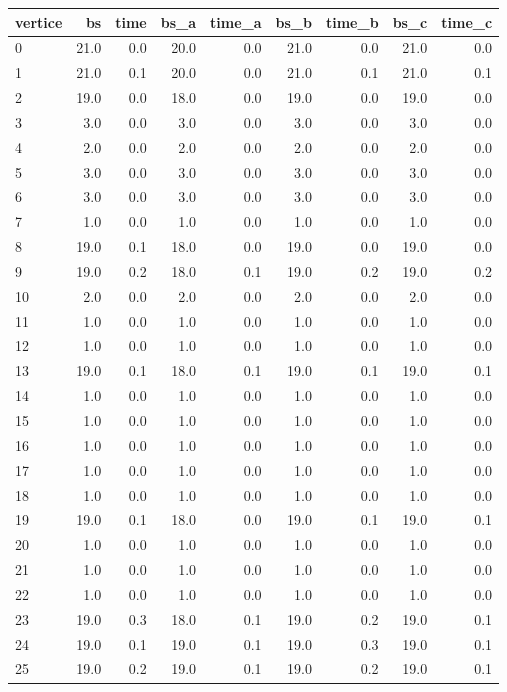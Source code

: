 \begin{tabular}{lrrrrrrrr}
\toprule
vertice & bs & time & bs_a & time_a & bs_b & time_b & bs_c & time_c \\
\midrule
0 & 21.0 & 0.0 & 20.0 & 0.0 & 21.0 & 0.0 & 21.0 & 0.0 \\
1 & 21.0 & 0.1 & 20.0 & 0.0 & 21.0 & 0.1 & 21.0 & 0.1 \\
2 & 19.0 & 0.0 & 18.0 & 0.0 & 19.0 & 0.0 & 19.0 & 0.0 \\
3 & 3.0 & 0.0 & 3.0 & 0.0 & 3.0 & 0.0 & 3.0 & 0.0 \\
4 & 2.0 & 0.0 & 2.0 & 0.0 & 2.0 & 0.0 & 2.0 & 0.0 \\
5 & 3.0 & 0.0 & 3.0 & 0.0 & 3.0 & 0.0 & 3.0 & 0.0 \\
6 & 3.0 & 0.0 & 3.0 & 0.0 & 3.0 & 0.0 & 3.0 & 0.0 \\
7 & 1.0 & 0.0 & 1.0 & 0.0 & 1.0 & 0.0 & 1.0 & 0.0 \\
8 & 19.0 & 0.1 & 18.0 & 0.0 & 19.0 & 0.0 & 19.0 & 0.0 \\
9 & 19.0 & 0.2 & 18.0 & 0.1 & 19.0 & 0.2 & 19.0 & 0.2 \\
10 & 2.0 & 0.0 & 2.0 & 0.0 & 2.0 & 0.0 & 2.0 & 0.0 \\
11 & 1.0 & 0.0 & 1.0 & 0.0 & 1.0 & 0.0 & 1.0 & 0.0 \\
12 & 1.0 & 0.0 & 1.0 & 0.0 & 1.0 & 0.0 & 1.0 & 0.0 \\
13 & 19.0 & 0.1 & 18.0 & 0.1 & 19.0 & 0.1 & 19.0 & 0.1 \\
14 & 1.0 & 0.0 & 1.0 & 0.0 & 1.0 & 0.0 & 1.0 & 0.0 \\
15 & 1.0 & 0.0 & 1.0 & 0.0 & 1.0 & 0.0 & 1.0 & 0.0 \\
16 & 1.0 & 0.0 & 1.0 & 0.0 & 1.0 & 0.0 & 1.0 & 0.0 \\
17 & 1.0 & 0.0 & 1.0 & 0.0 & 1.0 & 0.0 & 1.0 & 0.0 \\
18 & 1.0 & 0.0 & 1.0 & 0.0 & 1.0 & 0.0 & 1.0 & 0.0 \\
19 & 19.0 & 0.1 & 18.0 & 0.0 & 19.0 & 0.1 & 19.0 & 0.1 \\
20 & 1.0 & 0.0 & 1.0 & 0.0 & 1.0 & 0.0 & 1.0 & 0.0 \\
21 & 1.0 & 0.0 & 1.0 & 0.0 & 1.0 & 0.0 & 1.0 & 0.0 \\
22 & 1.0 & 0.0 & 1.0 & 0.0 & 1.0 & 0.0 & 1.0 & 0.0 \\
23 & 19.0 & 0.3 & 18.0 & 0.1 & 19.0 & 0.2 & 19.0 & 0.1 \\
24 & 19.0 & 0.1 & 19.0 & 0.1 & 19.0 & 0.3 & 19.0 & 0.1 \\
25 & 19.0 & 0.2 & 19.0 & 0.1 & 19.0 & 0.2 & 19.0 & 0.1 \\

\end{tabular}
